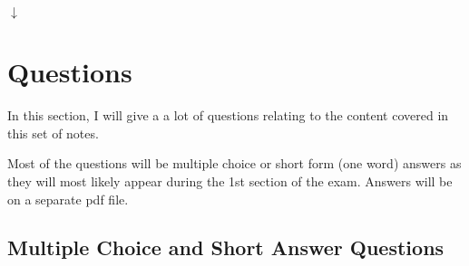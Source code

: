 \documentclass[a4paper,12pt]{article}
\begin{document}
\begin{center}
    $\downarrow$
\end{center}

\begin{center}
\end{center}

\hrulefill

\newpage

\section{Questions}

In this section, I will give a a lot of questions relating to the content covered in this set of notes.

Most of the questions will be multiple choice or short form (one word) answers as they will most likely appear during the 1st section of the exam. Answers will be on a separate pdf file.

\subsection{Multiple Choice and Short Answer Questions}
\end{document}
